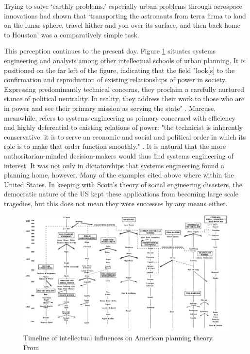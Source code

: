 \vspace{-7mm}

\begin{singlespcquote}
Trying to solve `earthly problems,' especially urban problems through aerospace innovations had shown that `transporting the astronauts from terra firma to land on the lunar sphere, travel hither and yon over its surface, and then back home to Houston' was a comparatively simple task. \cite{lightWarfareWelfareDefense2005}
\end{singlespcquote}

This perception continues to the present day. Figure \ref{fig:friedman_timeline} situates systems engineering and analysis among other intellectual schools of urban planning. It is positioned on the far left of the figure, indicating that the field "look[s] to the confirmation and reproduction of existing relationships of power in society. Expressing predominantly technical concerns, they proclaim a carefully nurtured stance of political neutrality. In reality, they address their work to those who are in power and see their primary mission as serving the state" \cite{mazza2017}. Marcuse, meanwhile, refers to systems engineering as primary concerned with efficiency and highly deferential to existing relations of power: "the technicist is inherently conservative: it is to serve an economic and social and political order in which its role is to make that order function smoothly." \cite{marcuseThreeHistoricCurrents2016}. It is natural that the more authoritarian-minded decision-makers would thus find systems engineering of interest. It was not only in dictatorships that systems engineering found a planning home, however. Many of the examples cited above where within the United States. In keeping with Scott's theory of social engineering disasters, the democratic nature of the US kept these applications from becoming large scale tragedies, but this does not mean they were successes by any means either. 

\clearpage
\begin{landscape}
\begin{figure}[t]
	\centering
	\includegraphics[scale=0.60]{Figures/chap2/friedman_timeline.png}
	\caption[Timeline of intellectual influences on American planning theory]{Timeline of intellectual influences on American planning theory. From \cite{mazza2017}}
	\label{fig:friedman_timeline}
\end{figure}
\end{landscape}
\clearpage

